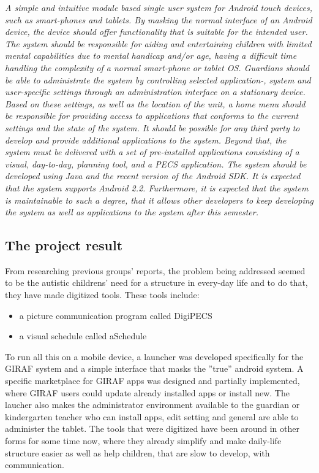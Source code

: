\textit{A simple and intuitive module based single user system for Android touch devices, such as smart-phones and tablets. By masking the normal interface of an Android device, the device should offer functionality that is suitable for the intended user.
The system should be responsible for aiding and entertaining children with limited mental capabilities due to mental handicap and/or age, having a difficult time handling the complexity of a normal smart-phone or tablet OS. Guardians should be able to administrate the system by controlling selected application-, system and user-specific settings through an administration interface on a stationary device. Based on these settings, as well as the location of the unit, a home menu should be responsible for providing access to applications that conforms to the current settings and the state of the system. It should be possible for any third party to develop and provide additional applications to the system. Beyond that, the system must be delivered with a set of pre-installed applications consisting of a visual, day-to-day, planning tool, and a PECS application. The system should be developed using Java and the recent version of the Android SDK. It is expected that the system supports Android 2.2. Furthermore, it is expected that the system is maintainable to such a degree, that it allows other developers to keep developing the system as well as applications to the system after this semester.}

\subsection{The project result}
From researching previous groups' reports, the problem being addressed seemed to be the autistic childrens' need for a structure in every-day life and to do that, they have made digitized tools. These tools include:
\begin{itemize}
	\item a picture communication program called DigiPECS
	\item a visual schedule called aSchedule
\end{itemize}

To run all this on a mobile device, a launcher was developed specifically for the GIRAF system and a simple interface that masks the ''true'' android system. A specific marketplace for GIRAF apps was designed and partially implemented, where GIRAF users could update already installed apps or install new. The laucher also makes the administrator environment available to the guardian or kindergarten teacher who can install apps, edit setting and general are able to administer the tablet.
The tools that were digitized have been around in other forms for some time now, where they already simplify and make daily-life structure easier as well as help children, that are slow to develop, with communication.

